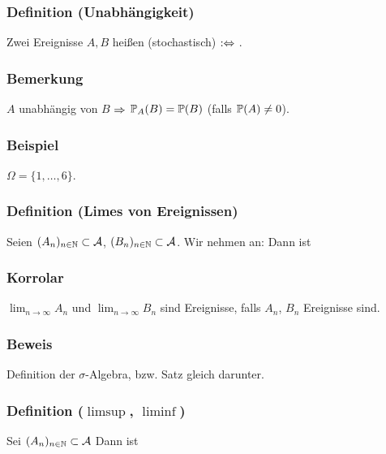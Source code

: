 \subsubsection{Definition (Unabh\"angigkeit)}
Zwei Ereignisse $A,B$ hei\ss{}en (stochastisch)  $:\Leftrightarrow$
.
\subsubsection{Bemerkung}
$A$ unabh\"angig von $B$ $\Rightarrow$ $\mathbb{P}_A(B)=\mathbb{P}(B)$ (falls $\mathbb{P}(A)\neq0$).
\subsubsection{Beispiel}
$\Omega=\{1,\ldots,6\}$.
\subsubsection{Definition (Limes von Ereignissen)}
Seien $(A_n)_{n\in\mathbb{N}}\subset\mathcal{A}$, $(B_n)_{n\in\mathbb{N}}\subset\mathcal{A}$.
Wir nehmen an:
Dann ist
\subsubsection{Korrolar}
$\lim_{n\to\infty}A_n$ und $\lim_{n\to\infty}B_n$ sind Ereignisse, falls $A_n$, $B_n$ Ereignisse sind.
\subsubsection{Beweis}
Definition der $\sigma$-Algebra, bzw. Satz gleich darunter.
\subsubsection{Definition ($\limsup$, $\liminf$)}
Sei $(A_n)_{n\in\mathbb{N}}\subset\mathcal{A}$ Dann ist
